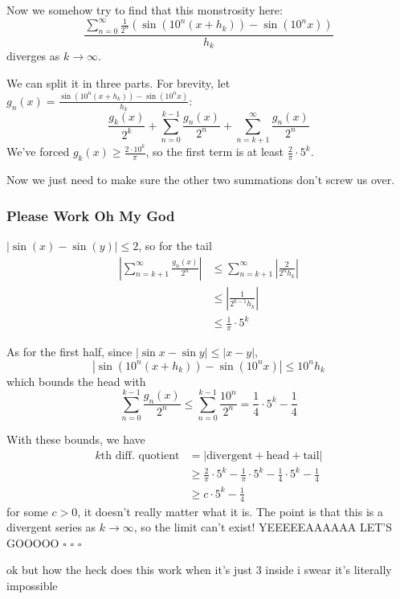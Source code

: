 \documentclass[12pt]{article}
\begin{document}
Now we somehow try to find that this monstrosity here:
\[\frac{\sum_{n=0}^{\infty} \frac{1}{2^n}\left(\sin\left(10^n(x+h_k)\right)-\sin\left(10^nx\right)\right)}{h_k}\]
diverges as $k \to \infty$.

We can split it in three parts.
For brevity, let $g_n(x)=\frac{\sin\left(10^n(x+h_k)\right)-\sin\left(10^nx\right)}{h_k}$:
\[\frac{g_k(x)}{2^k}+\sum_{n=0}^{k-1} \frac{g_n(x)}{2^n}+\sum_{n=k+1}^{\infty} \frac{g_n(x)}{2^n}\]
We've forced $g_k(x) \ge \frac{2 \cdot 10^k}{\pi}$,
so the first term is at least $\frac{2}{\pi} \cdot 5^k$.

Now we just need to make sure the other two summations don't screw us over.

\subsubsection{Please Work Oh My God}

$|\sin(x)-\sin(y)| \le 2$, so for the tail
\begin{align*}
  \left|\sum_{n=k+1}^{\infty} \frac{g_n(x)}{2^n}\right|
   & \le \sum_{n=k+1}^{\infty} \left|\frac{2}{2^n h_k}\right| \\
   & \le \left|\frac{1}{2^{k-1}h_k}\right|                    \\
   & \le \frac{1}{\pi} \cdot 5^k
\end{align*}

As for the first half, since $|\sin x - \sin y| \le |x-y|$,
\[\left|\sin\left(10^n(x+h_k)\right)-\sin\left(10^nx\right)\right| \le 10^nh_k\]
which bounds the head with
\[\sum_{n=0}^{k-1} \frac{g_n(x)}{2^n} \le \sum_{n=0}^{k-1} \frac{10^n}{2^n}=\frac{1}{4} \cdot 5^k - \frac{1}{4}\]

With these bounds, we have
\begin{align*}
  \text{$k$th diff. quotient}
   & = |\text{divergent} + \text{head} + \text{tail}|                                            \\
   & \ge \frac{2}{\pi} \cdot 5^k - \frac{1}{\pi} \cdot 5^k - \frac{1}{4} \cdot 5^k - \frac{1}{4} \\
   & \ge c \cdot 5^k - \frac{1}{4}
\end{align*}
for some $c > 0$, it doesn't really matter what it is.
The point is that this is a divergent series as $k \to \infty$,
so the limit can't exist! YEEEEEAAAAAA LET'S GOOOOO $\square$ $\square$ $\square$

\small{ok but how the heck does this work when it's just $3$ inside i swear it's literally impossible}
\end{document}
